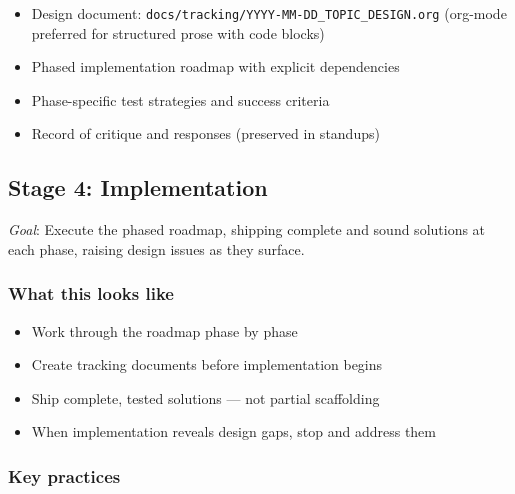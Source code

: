 \documentclass[11pt]{article}
\begin{document}
\begin{itemize}
\item Design document: \texttt{docs/tracking/YYYY-MM-DD\_TOPIC\_DESIGN.org}
(org-mode preferred for structured prose with code blocks)
\item Phased implementation roadmap with explicit dependencies
\item Phase-specific test strategies and success criteria
\item Record of critique and responses (preserved in standups)
\end{itemize}
\subsection{Stage 4: Implementation}
\label{sec:orgaddc453}

\emph{Goal}: Execute the phased roadmap, shipping complete and sound solutions
at each phase, raising design issues as they surface.
\subsubsection{What this looks like}
\label{sec:orga3208de}

\begin{itemize}
\item Work through the roadmap phase by phase
\item Create tracking documents before implementation begins
\item Ship complete, tested solutions --- not partial scaffolding
\item When implementation reveals design gaps, stop and address them
\end{itemize}
\subsubsection{Key practices}
\label{sec:org989217c}
\end{document}
